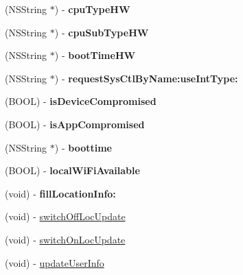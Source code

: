 \begin{DoxyCompactItemize}
\item 
\hypertarget{interface_user_info_aa8f911cce28be06b4a444b52e77e873d}{
(NSString $\ast$) -\/ {\bfseries cpuTypeHW}}
\label{interface_user_info_aa8f911cce28be06b4a444b52e77e873d}

\item 
\hypertarget{interface_user_info_a749cd951dd7c7869221b12440192933e}{
(NSString $\ast$) -\/ {\bfseries cpuSubTypeHW}}
\label{interface_user_info_a749cd951dd7c7869221b12440192933e}

\item 
\hypertarget{interface_user_info_aaf97905d5b6f79f3b6d0b61246a50a8a}{
(NSString $\ast$) -\/ {\bfseries bootTimeHW}}
\label{interface_user_info_aaf97905d5b6f79f3b6d0b61246a50a8a}

\item 
\hypertarget{interface_user_info_accd6779fdecb1b74fb921a3b8378af28}{
(NSString $\ast$) -\/ {\bfseries requestSysCtlByName:useIntType:}}
\label{interface_user_info_accd6779fdecb1b74fb921a3b8378af28}

\item 
\hypertarget{interface_user_info_ac2e96056515dff17c50a2ae95d75e556}{
(BOOL) -\/ {\bfseries isDeviceCompromised}}
\label{interface_user_info_ac2e96056515dff17c50a2ae95d75e556}

\item 
\hypertarget{interface_user_info_a0eba44455d23c3d73a7fac9c6777a0cb}{
(BOOL) -\/ {\bfseries isAppCompromised}}
\label{interface_user_info_a0eba44455d23c3d73a7fac9c6777a0cb}

\item 
\hypertarget{interface_user_info_acfa35778a750024007e4c81ddc2ff13c}{
(NSString $\ast$) -\/ {\bfseries boottime}}
\label{interface_user_info_acfa35778a750024007e4c81ddc2ff13c}

\item 
\hypertarget{interface_user_info_a290ba261c5925ac26ae39f9a4b1fa46d}{
(BOOL) -\/ {\bfseries localWiFiAvailable}}
\label{interface_user_info_a290ba261c5925ac26ae39f9a4b1fa46d}

\item 
\hypertarget{interface_user_info_a5873a415526fc833beff5e5f83d57eda}{
(void) -\/ {\bfseries fillLocationInfo:}}
\label{interface_user_info_a5873a415526fc833beff5e5f83d57eda}

\item 
(void) -\/ \hyperlink{interface_user_info_ab389ca4a13e06d956067999b5d57e11d}{switchOffLocUpdate}
\item 
(void) -\/ \hyperlink{interface_user_info_a36c937fe63c790e986418a6791be5518}{switchOnLocUpdate}
\item 
(void) -\/ \hyperlink{interface_user_info_a6fe530b19171cc727d65a6bf4b8a51bb}{updateUserInfo}
\end{DoxyCompactItemize}
